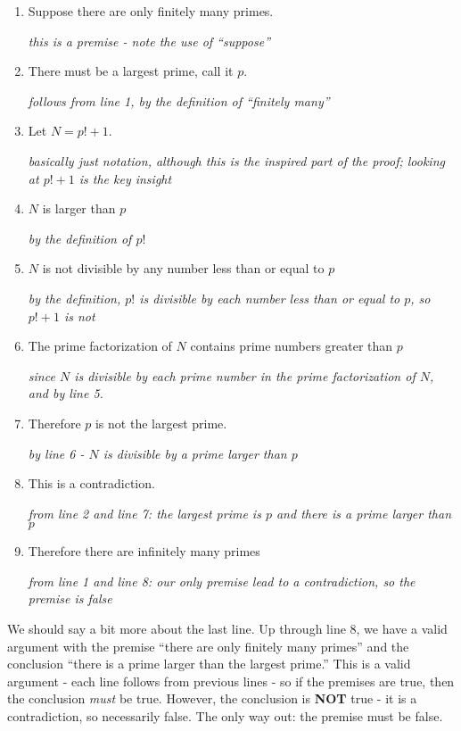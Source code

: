 \documentclass[12pt]{article}
\begin{document}
 \begin{enumerate}
  \item Suppose there are only finitely many primes.
 
 \hfill{\em this is a premise - note the use of ``suppose''}
 \item  There must be a largest prime, call it $p$. 
 
 \hfill{\em follows from line 1, by the definition of ``finitely many''}
 \item Let $N = p! + 1$.
 
 \hfill {\em basically just notation, although this is the inspired part of the proof; looking at $p! + 1$ is the key insight}
 \item $N$ is larger than $p$
 
 \hfill {\em by the definition of $p!$}
 \item $N$ is not divisible by any number less than or equal to $p$ 
 
 \hfill {\em by the definition, $p!$ is divisible by each number less than or equal to $p$, so $p! + 1$ is not}
 \item The prime factorization of $N$ contains prime numbers greater than $p$ 
 
 \hfill {\em since $N$ is divisible by each prime number in the prime factorization of $N$, and by line 5.}
 \item Therefore $p$ is not the largest prime.
 
 \hfill {\em by line 6 - $N$ is divisible by a prime larger than $p$}
 \item This is a contradiction.
 
 \hfill {\em from line 2 and line 7: the largest prime is $p$ and there is a prime larger than $p$}
 \item Therefore there are infinitely many primes
 
 \hfill {\em from line 1 and line 8: our only premise lead to a contradiction, so the premise is false}
 \end{enumerate}
 
 We should say a bit more about the last line.  Up through line 8, we have a valid argument with the premise ``there are only finitely many primes'' and the conclusion ``there is a prime larger than the largest prime.''  This is a valid argument - each line follows from previous lines - so if the premises are true, then the conclusion \emph{must} be true.  However, the conclusion is \textbf{NOT} true - it is a contradiction, so necessarily false.  The only way out: the premise must be false.  
 
\end{document}
